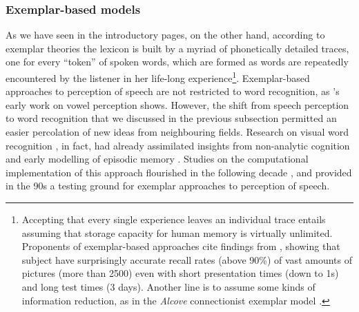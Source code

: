 \subsubsection{Exemplar-based models}\label{sec1113}
As we have seen in the introductory pages, on the other hand, according to exemplar theories the lexicon is built by a myriad of phonetically detailed traces, one for every ``token'' of spoken words, which are formed as words are repeatedly encountered by the listener in her life-long experience\footnote{Accepting that every single experience leaves an individual trace entails assuming that storage capacity for human memory is virtually unlimited. Proponents of exemplar-based approaches cite findings from \citet{standing1970perception}, showing that subject have surprisingly accurate recall rates (above 90\%) of vast amounts of pictures (more than 2500) even with short presentation times (down to 1s) and long test times (3 days). Another line is to assume some kinds of information reduction, as in the \textit{Alcove} connectionist exemplar model \citep{kruschke1992alcove}.}. Exemplar-based approaches to perception of speech are not restricted to word recognition, as \citeauthor{johnson1997speech}'s \citeyear{johnson1997speech} early work on vowel perception shows. However, the shift from speech perception to word recognition that we discussed in the previous subsection permitted an easier percolation of new ideas from neighbouring fields. Research on visual word recognition \citep{tenpenny1995abstractionist}, in fact, had already assimilated insights from non-analytic cognition \citep{brooks1978nonanalytic} and  early modelling of episodic memory \citep{medin1978context}. Studies on the computational implementation of this approach flourished in the following decade \citep{mcclelland1981retrieving, hintzman1986schema, nosofsky1986attention}, and provided in the 90s a testing ground for exemplar approaches to perception of speech.

